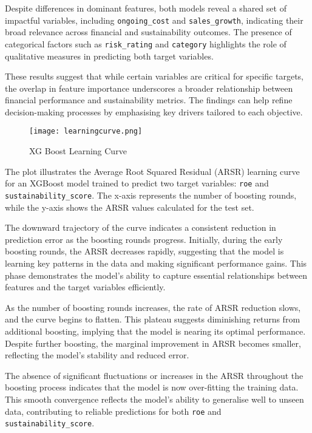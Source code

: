Despite differences in dominant features, both models reveal a shared set of impactful variables, including \texttt{ongoing\_cost} and \texttt{sales\_growth}, indicating their broad relevance across financial and sustainability outcomes. The presence of categorical factors such as \texttt{risk\_rating} and \texttt{category} highlights the role of qualitative measures in predicting both target variables. 

These results suggest that while certain variables are critical for specific targets, the overlap in feature importance underscores a broader relationship between financial performance and sustainability metrics. The findings can help refine decision-making processes by emphasising key drivers tailored to each objective.


\begin{figure}[H]
    \centering
    \texttt{[image: learningcurve.png]}
    \caption{XG Boost Learning Curve}
    \label{fig:learningcurve}
\end{figure}

\noindent The plot illustrates the Average Root Squared Residual (ARSR) learning curve for an XGBoost model trained to predict two target variables: \texttt{roe} and \texttt{sustainability\_score}. The x-axis represents the number of boosting rounds, while the y-axis shows the ARSR values calculated for the test set. 

The downward trajectory of the curve indicates a consistent reduction in prediction error as the boosting rounds progress. Initially, during the early boosting rounds, the ARSR decreases rapidly, suggesting that the model is learning key patterns in the data and making significant performance gains. This phase demonstrates the model's ability to capture essential relationships between features and the target variables efficiently.

As the number of boosting rounds increases, the rate of ARSR reduction slows, and the curve begins to flatten. This plateau suggests diminishing returns from additional boosting, implying that the model is nearing its optimal performance. Despite further boosting, the marginal improvement in ARSR becomes smaller, reflecting the model's stability and reduced error.

The absence of significant fluctuations or increases in the ARSR throughout the boosting process indicates that the model is now over-fitting the training data. This smooth convergence reflects the model's ability to generalise well to unseen data, contributing to reliable predictions for both \texttt{roe} and \texttt{sustainability\_score}.


